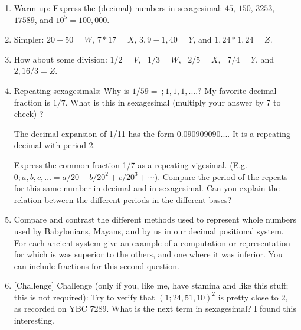 \documentclass[12pt]{article}
\begin{document}
    \begin{enumerate}

    \item 
      Warm-up: Express the (decimal) numbers in sexagesimal: $45$,   $150$,    $3253$,    $17589$, and    \newline $10^5=100,000$.

        
     \item        
        Simpler: $20 + 50 = W$,      $7*17 = X$,      $3,9 - 1,40 = Y$, and      $1,24*1,24 = Z$.

    \item 
        How about some division: $1/2 = V$, \      $1/3 = W$, \      $2/5 = X$, \      $7/4 = Y$,  and      $2,16/3 = Z$.

    \item 
      Repeating sexagesimals: Why is $1/59 =\ ;1,1,1,....$?
      My favorite decimal fraction is $1/7$. What is this in sexagesimal (multiply your answer by 7 to check) ?
      
      The decimal expansion of 1/11 has the form $0.090909090....$ It is a repeating decimal with period 2.
      
      Express the common fraction 1/7 as a repeating vigesimal. (E.g. $0;a,b,c,\dotsc = a/20 + b/20^2 + c/20^3 + \dotsb$).
      Compare the period of the repeats for this same number in decimal and in sexagesimal.
      Can you explain the relation between the different periods in the different bases?

    \item 
        Compare and contrast the different methods used to represent whole numbers used by Babylonians, Mayans, and by us in our decimal
        positional system. For each ancient system give an example of a computation or representation for which is was superior to the
        others, and one where it was inferior. You can include fractions for this second question. 

    \item {[Challenge]}
      Challenge (only if you, like me, have stamina and like this stuff; this is not required):
       Try to verify that $(1;24,51,10)^2$ is pretty close to
        2, as recorded on YBC 7289. What is the next term in sexagesimal? I found this interesting. 
    \end{enumerate}
\end{document}
